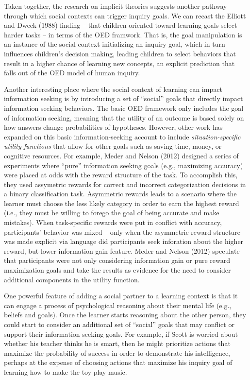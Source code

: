 \documentclass[english,floatsintext,man]{apa6}
\theoremstyle{definition}
\theoremstyle{definition}
\theoremstyle{definition}
\theoremstyle{remark}
\begin{document}
Taken together, the research on implicit theories suggests another
pathway through which social contexts can trigger inquiry goals. We can
recast the Elliott and Dweck (1988) finding -- that children oriented
toward learning goals select harder tasks -- in terms of the OED
framwork. That is, the goal manipulation is an instance of the social
context initializing an inquiry goal, which in turn influences
children's decision making, leading children to select behaviors that
result in a higher chance of learning new concepts, an explicit
prediction that falls out of the OED model of human inquiry.

Another interesting place where the social context of learning can
impact information seeking is by introducing a set of \enquote{social}
goals that directly impact information seeking behaviors. The basic OED
framework only includes the goal of information seeking, meaning that
the utility of an outcome is based solely on how answers change
probabilities of hypotheses. However, other work has expanded on this
basic information-seeking account to include \emph{situation-specific
utility functions} that allow for other goals such as saving time,
money, or cognitive resources. For example, Meder and Nelson (2012)
designed a series of experiments where \enquote{pure} information
seeking goals (e.g., maximizing accuracy) were placed at odds with the
reward structure of the task. To accomplish this, they used assymetric
rewards for correct and incorrect categorization decisions in a binary
classification task. Asymmetric rewards leads to a scenario where the
learner must choose the less likely category in order to earn the
highest reward (i.e., they must be willing to forego the goal of being
accurate and make mistakes). When task-specific rewards were put in
conflict with accuracy, participants' behavior was mixed -- only when
the asymmetric reward structure was made explicit via language did
participants seek inforation about the higher reward, but lower
information gain feature. Meder and Nelson (2012) speculate that
participants were not only considering information gain or pure reward
maximization goals and take the results as evidence for the need to
consider additional components in the utility function.

One powerful feature of adding a social partner to a learning context is
that it can engage a process of psychological reasoning about their
mental life (e.g., beliefs and goals). Once the learner starts reasoning
about the other person, they could start to consider an additional set
of \enquote{social} goals that may conflict or support their information
seeking goals. For example, if Scott is worried about whether his
teacher thinks he is smart, then he might prioritize actions that
maximize the probability of success in order to demonstrate his
intelligence, perhaps at the expense of choosing actions that maximize
his inquiry goal of learning how to make the toy play music.
\end{document}
